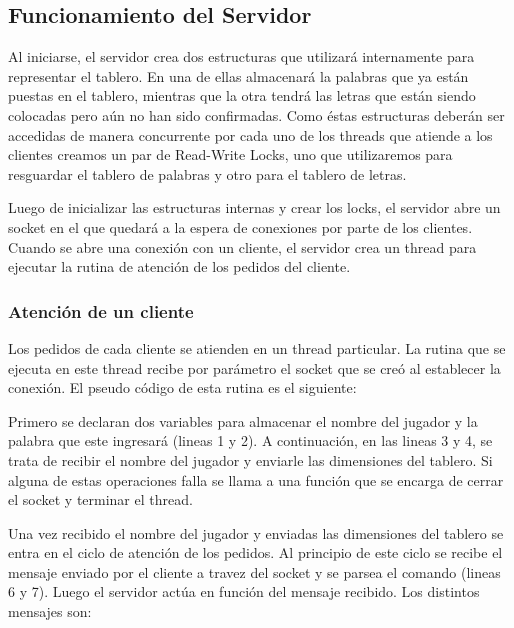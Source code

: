 \documentclass[a4paper,11pt]{article}
\begin{document}
\subsection{Funcionamiento del Servidor}
	Al iniciarse, el servidor crea dos estructuras que utilizará internamente para representar el tablero. En una de ellas almacenará la palabras que ya están puestas en el tablero, mientras que la otra tendrá las letras que están siendo colocadas pero aún no han sido confirmadas. Como éstas estructuras deberán ser accedidas de manera concurrente por cada uno de los threads que atiende a los clientes creamos un par de Read-Write Locks, uno que utilizaremos para resguardar el tablero de palabras y otro para el tablero de letras.
	
	Luego de inicializar las estructuras internas y crear los locks, el servidor abre un socket en el que quedará a la espera de conexiones por parte de los clientes. Cuando se abre una conexión con un cliente, el servidor crea un thread para ejecutar la rutina de atención de los pedidos del cliente.

\subsubsection{Atención de un cliente}
	Los pedidos de cada cliente se atienden en un thread particular. La rutina que se ejecuta en este thread recibe por parámetro el socket que se creó al establecer la conexión.
	El pseudo código de esta rutina es el siguiente:
	\newpage
	
	\restoregeometry

	Primero se declaran dos variables para almacenar el nombre del jugador y la palabra que este ingresará (lineas 1 y 2). A continuación, en las lineas 3 y 4, se trata de recibir el nombre del jugador y enviarle las dimensiones del tablero. Si alguna de estas operaciones falla se llama a una función que se encarga de cerrar el socket y terminar el thread.
	
	Una vez recibido el nombre del jugador y enviadas las dimensiones del tablero se entra en el ciclo de atención de los pedidos. Al principio de este ciclo se recibe el mensaje enviado por el cliente a travez del socket y se parsea el comando (lineas 6 y 7). Luego el servidor actúa en función del mensaje recibido. Los distintos mensajes son:
	
\end{document}

